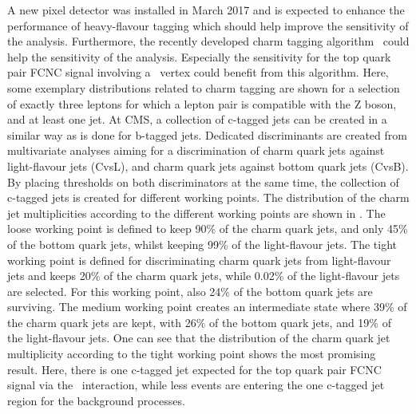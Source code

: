 A new pixel detector was installed in March 2017 and is expected to enhance the performance of heavy-flavour tagging which should help improve the sensitivity of the analysis. Furthermore, the recently developed charm tagging algorithm~\cite{CMS-PAS-BTV-16-001} could help the sensitivity of the analysis.  Especially  the sensitivity for the top quark pair FCNC signal involving a \Zct\ vertex could benefit from this algorithm. Here, some exemplary distributions related to charm tagging are shown for a selection of exactly three leptons for which a lepton pair is compatible with the Z boson, and at least one jet. At CMS, a collection of c-tagged jets can be created in a similar way as is done for b-tagged jets. Dedicated discriminants are created from multivariate analyses aiming for a discrimination of charm quark jets against light-flavour jets (CvsL),  and charm quark jets against bottom quark jets (CvsB). By placing thresholds on both discriminators at the same time, the collection of c-tagged jets is created for different working points. The distribution of the charm jet multiplicities according to the different working points are shown in . The loose working point is defined to keep 90\% of the charm quark jets, and only 45\% of the bottom quark jets, whilst keeping 99\% of the light-flavour jets. The tight working point is defined for discriminating charm quark jets from light-flavour jets and keeps 20\% of the charm quark jets, while 0.02\% of the light-flavour jets are selected. For this working point, also 24\% of the bottom quark jets are surviving. The medium working point creates an intermediate state where 39\% of the charm quark jets are kept, with 26\% of the bottom quark jets, and 19\% of the light-flavour jets. One can see that the distribution of the charm quark jet multiplicity according to the tight working point shows the most promising result. Here, there is one c-tagged jet expected for the top quark pair FCNC signal via the \Zct\ interaction, while less events are entering the one c-tagged jet region for the  background processes.
